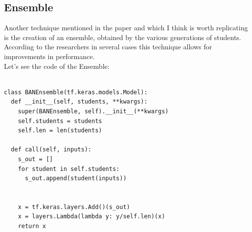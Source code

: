 \subsection{Ensemble}
Another technique mentioned in the paper\cite{ban} and which I think is worth replicating is the creation of an ensemble, obtained by the various generations of students. According to the researchers in several cases this technique allows for improvements in performance.\\
Let's see the code of the Ensemble:
\lstset{language=Python}
\lstset{frame=lines}
\lstset{basicstyle=\footnotesize}
\begin{lstlisting}

class BANEnsemble(tf.keras.models.Model):
  def __init__(self, students, **kwargs):
    super(BANEnsemble, self).__init__(**kwargs)
    self.students = students
    self.len = len(students)
  
  def call(self, inputs):
    s_out = []
    for student in self.students:
      s_out.append(student(inputs))
      
    
    x = tf.keras.layers.Add()(s_out)
    x = layers.Lambda(lambda y: y/self.len)(x)
    return x

\end{lstlisting}

